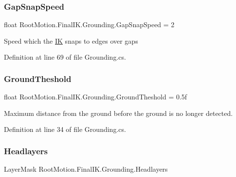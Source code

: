 \subsubsection{\texorpdfstring{Gap\+Snap\+Speed}{GapSnapSpeed}}
{\footnotesize\ttfamily float Root\+Motion.\+Final\+I\+K.\+Grounding.\+Gap\+Snap\+Speed = 2}



Speed which the \mbox{\hyperlink{class_root_motion_1_1_final_i_k_1_1_i_k}{IK}} snaps to edges over gaps 



Definition at line 69 of file Grounding.\+cs.

\mbox{\label{class_root_motion_1_1_final_i_k_1_1_grounding_ac65163d84ce572e6954c3472a136d86a}} 
\subsubsection{\texorpdfstring{Ground\+Theshold}{GroundTheshold}}
{\footnotesize\ttfamily float Root\+Motion.\+Final\+I\+K.\+Grounding.\+Ground\+Theshold = 0.\+5f}



Maximum distance from the ground before the ground is no longer detected. 



Definition at line 34 of file Grounding.\+cs.

\mbox{\label{class_root_motion_1_1_final_i_k_1_1_grounding_a3250efc7d29687a696d77c329c2f2fe4}} 
\subsubsection{\texorpdfstring{Headlayers}{Headlayers}}
{\footnotesize\ttfamily Layer\+Mask Root\+Motion.\+Final\+I\+K.\+Grounding.\+Headlayers}



